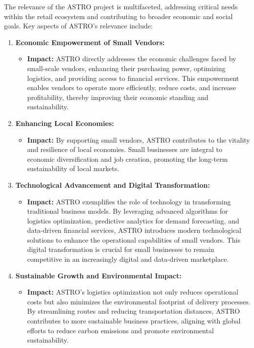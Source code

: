 	The relevance of the ASTRO project is multifaceted, addressing critical needs within the retail ecosystem and contributing to broader economic and social goals. Key aspects of ASTRO’s relevance include:

	\begin{enumerate}
		\item \textbf{Economic Empowerment of Small Vendors:}
		\begin{itemize}
			\item \textbf{Impact:} ASTRO directly addresses the economic challenges faced by small-scale vendors, enhancing their purchasing power, optimizing logistics, and providing access to financial services. This empowerment enables vendors to operate more efficiently, reduce costs, and increase profitability, thereby improving their economic standing and sustainability.
		\end{itemize}
		
		\item \textbf{Enhancing Local Economies:}
		\begin{itemize}
			\item \textbf{Impact:} By supporting small vendors, ASTRO contributes to the vitality and resilience of local economies. Small businesses are integral to economic diversification and job creation, promoting the long-term sustainability of local markets.
		\end{itemize}
		
		\item \textbf{Technological Advancement and Digital Transformation:}
		\begin{itemize}
			\item \textbf{Impact:} ASTRO exemplifies the role of technology in transforming traditional business models. By leveraging advanced algorithms for logistics optimization, predictive analytics for demand forecasting, and data-driven financial services, ASTRO introduces modern technological solutions to enhance the operational capabilities of small vendors. This digital transformation is crucial for small businesses to remain competitive in an increasingly digital and data-driven marketplace.
		\end{itemize}
		
		\item \textbf{Sustainable Growth and Environmental Impact:}
		\begin{itemize}
			\item \textbf{Impact:} ASTRO’s logistics optimization not only reduces operational costs but also minimizes the environmental footprint of delivery processes. By streamlining routes and reducing transportation distances, ASTRO contributes to more sustainable business practices, aligning with global efforts to reduce carbon emissions and promote environmental sustainability.
		\end{itemize}
		

\end{enumerate}
